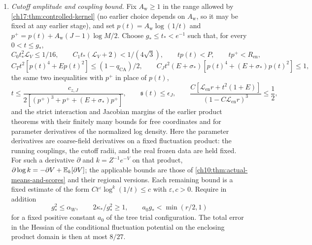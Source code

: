 \begin{theorem}
\begin{enumerate}[label=(\arabic*)]
\item \emph{Cutoff amplitude and coupling bound.} Fix $A_{\mathrm w}\ge1$ in the range allowed by \cref{ch17:thm:controlled-kernel} (no earlier choice depends on $A_{\mathrm w}$, so it may be fixed at any earlier stage), and set $p(t)=A_{\mathrm w}\log(1/t)$ and $p^+=p(t)+A_{\mathrm w}(J-1)\log M/2$. Choose $g_*\le t_*<e^{-1}$ such that, for every $0<t\le g_*$,
\[
 C_0t_*^2\mathcal L_V\le1/16,\qquad C_1t_*(\mathcal L_V+2)<1/(4\sqrt3),\qquad tp(t)<P,\qquad tp^+<R_{\mathrm{en}},
\]
\[
 C_Tt^2[p(t)^4+Ep(t)^2]\le(1-q_{\mathrm{CA}})/2,\qquad
 C_Jt^2(E+\sigma_*)[p(t)^4+(E+\sigma_*)p(t)^2]\le1,
\]
the same two inequalities with $p^+$ in place of $p(t)$,
\[
 t\le\frac{c_{z,J}}{2[(p^+)^3+p^++(E+\sigma_*)p^+]},\qquad \mathfrak s(t)\le\epsilon_J,\qquad
 \frac{C[\mathscr L_{\mathrm{en}}r+t^2(1+E)]}{(1-C\mathscr L_{\mathrm{en}}r)^3}\le\frac12,
\]
and the strict interaction and Jacobian margins of the earlier product theorems with their finitely many bounds for free coordinates and for parameter derivatives of the normalized log density. Here the parameter derivatives are coarse-field derivatives on a fixed fluctuation product: the running couplings, the cutoff radii, and the real frozen data are held fixed. For such a derivative $\partial$ and $k=Z^{-1}e^{-V}$ on that product, $\partial\log k=-\partial V+\mathbb E_k[\partial V]$; the applicable bounds are those of \cref{ch10:thm:actual-means-and-scores} and their regional versions. Each remaining bound is a fixed estimate of the form $Ct^\varepsilon\log^k(1/t)\le c$ with $\varepsilon,c>0$. Require in addition
\[
 g_*^2\le\alpha_W,\qquad 2\kappa_*/g_*^2\ge1,\qquad a_0g_*<\min(r/2,1)
\]
for a fixed positive constant $a_0$ of the tree trial configuration. The total error in the Hessian of the conditional fluctuation potential on the enclosing product domain is then at most $8/27$.


\end{enumerate}
\end{theorem}
